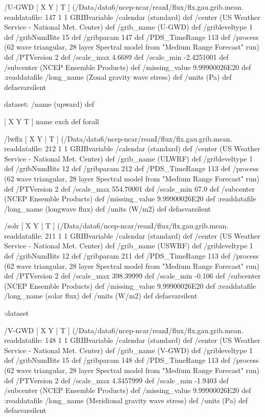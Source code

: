 \begin{ingrid}
  /U-GWD { [ X Y | T ] (/Data/data6/ncep-ncar/reanI/flux/flx.gau.grib.mean.%
  readdatafile:
  147 1 1 GRIBvariable
  /calendar (standard) def
  /center (US Weather Service - National Met. Center) def
  /grib_name (U-GWD) def
  /gribleveltype 1 def
  /gribNumBits 15 def
  /gribparam 147 def
  /PDS_TimeRange 113 def
  /process (62 wave triangular, 28 layer Spectral model from "Medium Range Forecast" run) def
  /PTVersion 2 def
  /scale_max 4.6689 def
  /scale_min -2.4251001 def
  /subcenter (NCEP Ensemble Products) def
  /missing_value 9.99900026E20 def
  :readdatafile
  /long_name (Zonal gravity wave stress) def
  /units (Pa) def
  } defasvarsilent

  dataset: /name (upward) def
 
   [ X Y T ] { name exch def } forall

   /lwflx { [ X Y | T ] (/Data/data6/ncep-ncar/reanI/flux/flx.gau.grib.mean.%
   readdatafile:
   212 1 1 GRIBvariable
   /calendar (standard) def
   /center (US Weather Service - National Met. Center) def
   /grib_name (ULWRF) def
   /gribleveltype 1 def
   /gribNumBits 12 def
   /gribparam 212 def
   /PDS_TimeRange 113 def
   /process (62 wave triangular, 28 layer Spectral model from "Medium Range Forecast" run) def
   /PTVersion 2 def
   /scale_max 554.70001 def
   /scale_min 67.0 def
   /subcenter (NCEP Ensemble Products) def
   /missing_value 9.99900026E20 def
   :readdatafile
   /long_name (longwave flux) def
   /units (W/m2) def
   } defasvarsilent

   /solr { [ X Y | T ] (/Data/data6/ncep-ncar/reanI/flux/flx.gau.grib.mean.%
   readdatafile:
   211 1 1 GRIBvariable
   /calendar (standard) def
   /center (US Weather Service - National Met. Center) def
   /grib_name (USWRF) def
   /gribleveltype 1 def
   /gribNumBits 12 def
   /gribparam 211 def
   /PDS_TimeRange 113 def
   /process (62 wave triangular, 28 layer Spectral model from "Medium Range Forecast" run) def
   /PTVersion 2 def
   /scale_max 398.39999 def
   /scale_min -0.106 def
   /subcenter (NCEP Ensemble Products) def
   /missing_value 9.99900026E20 def
   :readdatafile
   /long_name (solar flux) def
   /units (W/m2) def
   } defasvarsilent

  :dataset

  /V-GWD { [ X Y | T ] (/Data/data6/ncep-ncar/reanI/flux/flx.gau.grib.mean.%
  readdatafile:
  148 1 1 GRIBvariable
  /calendar (standard) def
  /center (US Weather Service - National Met. Center) def
  /grib_name (V-GWD) def
  /gribleveltype 1 def
  /gribNumBits 15 def
  /gribparam 148 def
  /PDS_TimeRange 113 def
  /process (62 wave triangular, 28 layer Spectral model from "Medium Range Forecast" run) def
  /PTVersion 2 def
  /scale_max 4.3457999 def
  /scale_min -1.9403 def
  /subcenter (NCEP Ensemble Products) def
  /missing_value 9.99900026E20 def
  :readdatafile
  /long_name (Meridional gravity wave stress) def
  /units (Pa) def
  } defasvarsilent


\end{ingrid}
